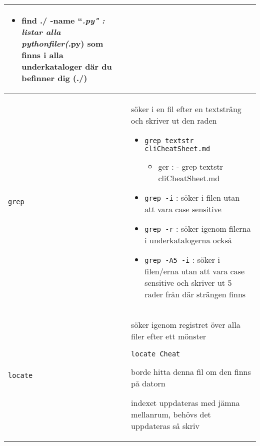 \documentclass[a4paper]{article}
\begin{document}
\begin{longtable}{l|l}
\begin{minipage}[t]{0.8\textwidth}
\begin{itemize}

\item
  find ./ -name ``\emph{.py" : listar alla pythonfiler(}.py) som finns i
  alla underkataloger d\"ar du befinner dig (./)
\end{itemize}

  \end{minipage}
  \\
  \midrule
  \begin{minipage}[t]{0.2\textwidth} 
    \texttt{grep}
  \end{minipage}
  &
  \begin{minipage}[t]{0.8\textwidth} 
s\"oker i en fil efter en textstr\"ang och skriver ut den raden

\begin{itemize}

\item
  \texttt{grep textstr cliCheatSheet.md}

  \begin{itemize}
  
  \item
    ger : - grep textstr cliCheatSheet.md
  \end{itemize}
\item
  \texttt{grep -i} : s\"oker i filen utan att vara case sensitive
\item
  \texttt{grep -r} : s\"oker igenom filerna i underkatalogerna ocks{\aa}
\item
  \texttt{grep -A5 -i} : s\"oker i filen/erna utan att vara case sensitive och
  skriver ut 5 rader fr{\aa}n d\"ar str\"angen finns
\end{itemize}

  \end{minipage}
  \\
  \midrule
  \begin{minipage}[t]{0.2\textwidth} 
    \texttt{locate}
  \end{minipage}
  &
  \begin{minipage}[t]{0.8\textwidth} 
s\"oker igenom registret \"over alla filer efter ett m\"onster

\begin{verbatim}
locate Cheat
\end{verbatim}

borde hitta denna fil om den finns p{\aa} datorn

indexet uppdateras med j\"amna mellanrum, beh\"ovs det uppdateras s{\aa} skriv


\end{minipage}
\end{longtable}
\end{document}
